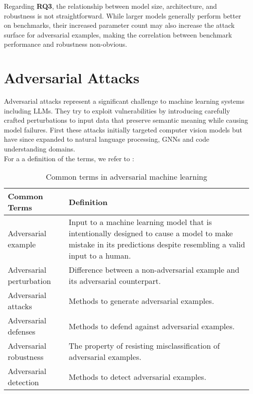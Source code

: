 \documentclass[%
thesis=student,%
coverpage=false,%
titlepage=false,%
headmarks=true, %
english,%
font=libertine, %
math=newpxtx, %
BCOR=5mm,%
coverBCOR=11mm%
]{tum-templates/book/tumbook}
\begin{document}
Regarding \textbf{RQ3}, the relationship between model size, architecture, and robustness is not straightforward. While larger models generally perform better on benchmarks, their increased parameter count may also increase the attack surface for adversarial examples, making the correlation between benchmark performance and robustness non-obvious.

\section{Adversarial Attacks}

Adversarial attacks represent a significant challenge to machine learning systems including LLMs. 
They try to exploit vulnerabilities by introducing carefully crafted perturbations to input data that preserve semantic meaning while causing model failures. First these attacks initially targeted computer vision models but have since expanded to natural language processing, GNNs and code understanding domains. \\
For a a definition of the terms, we refer to \cite{Wiyatno2019}:

\begin{table}[htbp]
    \centering
    \renewcommand{\arraystretch}{1.2}
    \begin{tabular}{|p{4cm}|p{11cm}|}
    \hline
    \textbf{Common Terms} & \textbf{Definition} \\
    \hline
    Adversarial example & Input to a machine learning model that is intentionally designed to cause a model to make mistake in its predictions despite resembling a valid input to a human. \\
    \hline
    Adversarial perturbation & Difference between a non-adversarial example and its adversarial counterpart. \\
    \hline
    Adversarial attacks & Methods to generate adversarial examples. \\
    \hline
    Adversarial defenses & Methods to defend against adversarial examples. \\
    \hline
    Adversarial robustness & The property of resisting misclassification of adversarial examples. \\
    \hline
    Adversarial detection & Methods to detect adversarial examples. \\
    \hline
    \end{tabular}
    \caption{Common terms in adversarial machine learning}
    \label{tab:adversarial_terms}
    \cite{Wiyatno2019}
\end{table}
\end{document}
